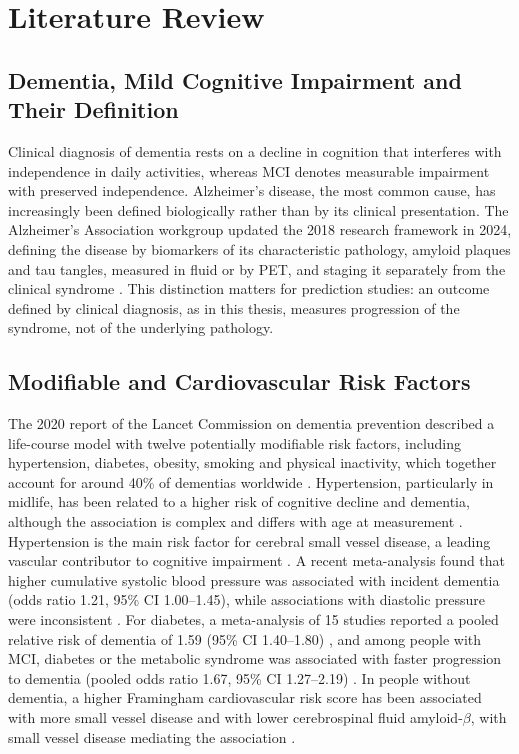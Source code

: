 \chapter{Literature Review}
\label{ch:lit}

\section{Dementia, Mild Cognitive Impairment and Their Definition}

Clinical diagnosis of dementia rests on a decline in cognition that interferes with independence in daily activities, whereas MCI denotes measurable impairment with preserved independence. Alzheimer's disease, the most common cause, has increasingly been defined biologically rather than by its clinical presentation. The Alzheimer's Association workgroup updated the 2018 research framework in 2024, defining the disease by biomarkers of its characteristic pathology, amyloid plaques and tau tangles, measured in fluid or by PET, and staging it separately from the clinical syndrome \cite{jack2024}. This distinction matters for prediction studies: an outcome defined by clinical diagnosis, as in this thesis, measures progression of the syndrome, not of the underlying pathology.

\section{Modifiable and Cardiovascular Risk Factors}

The 2020 report of the Lancet Commission on dementia prevention described a life-course model with twelve potentially modifiable risk factors, including hypertension, diabetes, obesity, smoking and physical inactivity, which together account for around 40\% of dementias worldwide \cite{livingston2020}. Hypertension, particularly in midlife, has been related to a higher risk of cognitive decline and dementia, although the association is complex and differs with age at measurement \cite{sierra2020}. Hypertension is the main risk factor for cerebral small vessel disease, a leading vascular contributor to cognitive impairment \cite{hainsworth2024}. A recent meta-analysis found that higher cumulative systolic blood pressure was associated with incident dementia (odds ratio 1.21, 95\% CI 1.00--1.45), while associations with diastolic pressure were inconsistent \cite{wang2026}. For diabetes, a meta-analysis of 15 studies reported a pooled relative risk of dementia of 1.59 (95\% CI 1.40--1.80) \cite{cao2024}, and among people with MCI, diabetes or the metabolic syndrome was associated with faster progression to dementia (pooled odds ratio 1.67, 95\% CI 1.27--2.19) \cite{pal2018}. In people without dementia, a higher Framingham cardiovascular risk score has been associated with more small vessel disease and with lower cerebrospinal fluid amyloid-$\beta$, with small vessel disease mediating the association \cite{lorenzini2024}.

